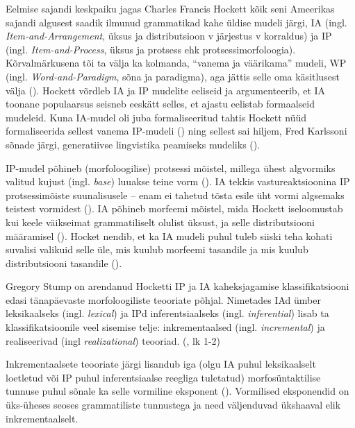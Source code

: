 \documentclass[12pt,a4paper]{article}
\begin{document}
Eelmise sajandi keskpaiku jagas Charles Francis Hockett kõik seni Ameerikas sajandi algusest saadik ilmunud grammatikad kahe üldise mudeli järgi, IA (ingl. \textit{Item-and-Arrangement}, üksus ja distributsioon v järjestus v korraldus) ja IP (ingl. \textit{Item-and-Process}, üksus ja protsess ehk protsessi\-morfoloogia). Kõrvalmärkusena tõi ta välja ka kolmanda, ``vanema ja väärikama'' mudeli, WP (ingl. \textit{Word-and-Paradigm}, sõna ja paradigma), aga jättis selle oma käsitlusest välja (\cite[210]{hockett_two_1954}). Hockett võrdleb IA ja IP mudelite eeliseid ja argumenteerib, et IA toonane populaarsus seisneb eeskätt selles, et ajastu eelistab formaalseid mudeleid. Kuna IA-mudel oli juba formaliseeritud tahtis Hockett nüüd formaliseerida sellest vanema IP-mudeli (\cite[214]{hockett_two_1954}) ning sellest sai hiljem, Fred Karlssoni sõnade järgi, generatiivse lingvistika peamiseks mudeliks (\cite[126]{karlsson_uldkeeleteadus_2002}).

IP-mudel põhineb (morfoloogilise) protsessi mõistel, millega ühest algvormiks valitud kujust (ingl. \textit{base}) luuakse teine vorm (\cite[210]{hockett_two_1954}). IA tekkis vastureaktsioonina IP protsessi\-mõiste suunalisusele -- enam ei tahetud tõsta esile üht vormi algsemaks teistest vormidest (\cite[211]{hockett_two_1954}). IA põhineb morfeemi mõistel, mida Hockett iseloomustab kui keele väikseimat grammatiliselt olulist üksust, ja selle distributsiooni määramisel (\cite[212]{hockett_two_1954}). Hocket nendib, et ka IA mudeli puhul tuleb siiski teha kohati suvalisi valikuid selle üle, mis kuulub morfeemi tasandile ja mis kuulub distributsiooni tasandile (\cite[212]{hockett_two_1954}).

Gregory Stump on arendanud Hocketti IP ja IA kaheks\-jagamise klassifikatsiooni edasi tänapäevaste morfoloogiliste teooriate põhjal. Nimetades IAd ümber leksikaalseks (ingl. \textit{lexical}) ja IPd inferentsiaalseks (ingl. \textit{inferential}) lisab ta klassifikatsioonile veel sisemise telje: inkrementaalsed (ingl. \textit{incremental}) ja realiseerivad (ingl \textit{realizational}) teooriad. (\cite{stump_inflectional_2001}, lk 1-2)

Inkrementaalsete teooriate järgi lisandub iga (olgu IA puhul leksikaalselt loetletud või IP puhul inferentsiaalse reegliga tuletatud) morfosüntaktilise tunnuse puhul sõnale ka selle vormiline eksponent (\cite[2]{stump_inflectional_2001}). Vormilised eksponendid on üks-üheses seoses grammatiliste tunnustega ja need väljenduvad ükshaaval elik inkrementaalselt.
\end{document}
